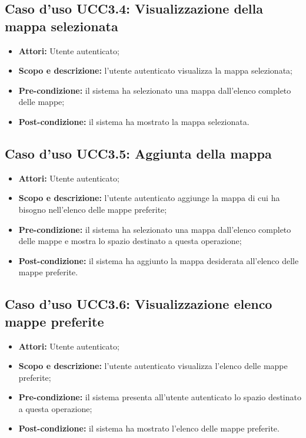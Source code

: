 \subsection{Caso d'uso UCC3.4: Visualizzazione della mappa selezionata}
\begin{itemize}
\item \textbf{Attori:} Utente autenticato;
\item \textbf{Scopo e descrizione:} l'utente autenticato visualizza la mappa selezionata;
\item \textbf{Pre-condizione:} il sistema ha selezionato una mappa dall'elenco completo delle mappe;
\item \textbf{Post-condizione:} il sistema ha mostrato la mappa selezionata.
\end{itemize}

\subsection{Caso d'uso UCC3.5: Aggiunta della mappa}

\begin{itemize}
\item \textbf{Attori:} Utente autenticato;
\item \textbf{Scopo e descrizione:} l'utente autenticato aggiunge la mappa di cui ha bisogno nell'elenco delle mappe preferite;
\item \textbf{Pre-condizione:} il sistema ha selezionato una mappa dall'elenco completo delle mappe e mostra lo spazio destinato a questa operazione;
\item \textbf{Post-condizione:} il sistema ha aggiunto la mappa desiderata all'elenco delle mappe preferite.
\end{itemize}

\subsection{Caso d'uso UCC3.6: Visualizzazione elenco mappe preferite}

\begin{itemize}
\item \textbf{Attori:} Utente autenticato;
\item \textbf{Scopo e descrizione:} l'utente autenticato visualizza l'elenco delle mappe preferite;
\item \textbf{Pre-condizione:} il sistema presenta all'utente autenticato lo spazio destinato a questa operazione;
\item \textbf{Post-condizione:} il sistema ha mostrato l'elenco delle mappe preferite.
\end{itemize}


